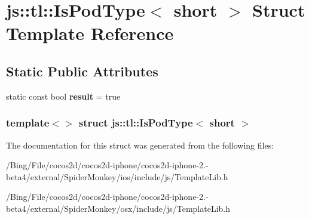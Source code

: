 \hypertarget{structjs_1_1tl_1_1_is_pod_type_3_01short_01_4}{\section{js\-:\-:tl\-:\-:Is\-Pod\-Type$<$ short $>$ Struct Template Reference}
\label{structjs_1_1tl_1_1_is_pod_type_3_01short_01_4}
}
\subsection*{Static Public Attributes}
\begin{DoxyCompactItemize}
\item 
\hypertarget{structjs_1_1tl_1_1_is_pod_type_3_01short_01_4_a6dcda39d0832162f00e4ac5bd4f0ed60}{static const bool {\bfseries result} = true}\label{structjs_1_1tl_1_1_is_pod_type_3_01short_01_4_a6dcda39d0832162f00e4ac5bd4f0ed60}

\end{DoxyCompactItemize}
\subsubsection*{template$<$$>$ struct js\-::tl\-::\-Is\-Pod\-Type$<$ short $>$}



The documentation for this struct was generated from the following files\-:\begin{DoxyCompactItemize}
\item 
/\-Bing/\-File/cocos2d/cocos2d-\/iphone/cocos2d-\/iphone-\/2.-\/beta4/external/\-Spider\-Monkey/ios/include/js/Template\-Lib.\-h\item 
/\-Bing/\-File/cocos2d/cocos2d-\/iphone/cocos2d-\/iphone-\/2.-\/beta4/external/\-Spider\-Monkey/osx/include/js/Template\-Lib.\-h\end{DoxyCompactItemize}
